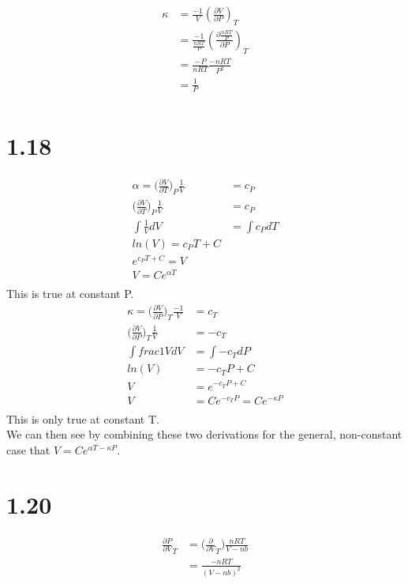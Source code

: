 \documentclass[10pt]{article} %
\begin{document}
\begin{align}
  \kappa &= \frac{-1}{V}(\frac{\partial V}{\partial P})_T\\  
  &= \frac{-1}{\frac{nRT}{P}}(\frac{\partial \frac{nRT}{P}}{\partial P})_T\\
  &= \frac{-P}{nRT}\frac{-nRT}{P^2}\\
  &= \frac{1}{P}\\
\end{align}

\section{1.18}

\begin{align}
  \alpha = \big(\frac{\partial V}{\partial T}\big)_P\frac{1}{V} &= c_P\\
  \big(\frac{\partial V}{\partial T}\big)_P\frac{1}{V} &= c_P\\
  \int \frac{1}{V} dV  &= \int c_P dT\\
  ln(V) = c_PT + C\\
  e^{c_PT+C} = V\\
  V = Ce^{\alpha T}\\
\end{align}
This is true at constant P. \\

\begin{align}
  \kappa = \big(\frac{\partial V}{\partial P}\big)_T \frac{-1}{V} &= c_T\\
  \big(\frac{\partial V}{\partial P}\big)_T \frac{1}{V} &= -c_T\\
  \int frac{1}{V} dV &= \int -c_T dP\\
  ln(V) &= -c_TP + C\\
  V &= e^{-c_TP+C}\\
  V &= Ce^{-c_TP} = Ce^{-\kappa P}\\
\end{align}
This is only true at constant T.\\

We can then see by combining these two derivations for the general, non-constant case that $V = Ce^{\alpha T -\kappa P}$.

\section{1.20}

\begin{align}
  \frac{\partial P}{\partial V}_T &= \big(\frac{\partial}{\partial V}_T\big) \frac{nRT}{V-nb}\\
  &= \frac{-nRT}{(V-nb)^2}\\
\end{align}
\end{document}
